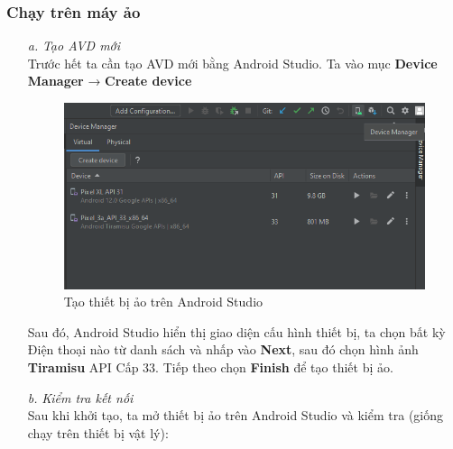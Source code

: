\subsubsection{Chạy trên máy ảo}
\begin{enumerate}
    \item[\textit{a.}] {\textit{Tạo AVD mới}}\\
    Trước hết ta cần tạo AVD mới bằng Android Studio. Ta vào mục \textbf{Device Manager} → \textbf{Create device}
    \begin{figure}[!ht]
        \centering
        \includegraphics[scale=0.5]{images/createAVD.png}
        \caption{Tạo thiết bị ảo trên Android Studio}
    \end{figure}
    Sau đó, Android Studio hiển thị giao diện cấu hình thiết bị, ta chọn bất kỳ Điện thoại nào từ danh sách và nhấp vào \textbf{Next}, sau đó chọn hình ảnh \textbf{Tiramisu} API Cấp 33. Tiếp theo chọn \textbf{Finish} để tạo thiết bị ảo.
    \item[\textit{b.}] {\textit{Kiểm tra kết nối}}\\
    Sau khi khởi tạo, ta mở thiết bị ảo trên Android Studio và kiểm tra (giống chạy trên thiết bị vật lý):
    \begin{figure}[!ht]
        \centering

\end{figure}
\end{enumerate}
